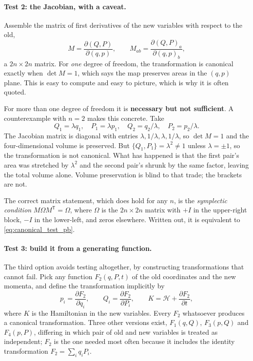 \documentclass[12pt]{article}
\newcommand{\Ham}{\mathcal{H}}
\newcommand{\pb}[2]{\{#1,#2\}}
\begin{document}
\paragraph{Test 2: the Jacobian, with a caveat.}  Assemble the matrix
of first derivatives of the new variables with respect to the old,
%
\begin{equation}
  M = \frac{\partial(Q,P)}{\partial(q,p)},
  \qquad
  M_{ab} = \frac{\partial(Q,P)_a}{\partial(q,p)_b} ,
  \label{eq:jacobian_matrix}
\end{equation}
%
a $2n\times 2n$ matrix.  For \emph{one} degree of freedom, the
transformation is canonical exactly when $\det M = 1$, which says the
map preserves areas in the $(q,p)$ plane.  This is easy to compute and
easy to picture, which is why it is often quoted.

For more than one degree of freedom it is \textbf{necessary but not
sufficient}.  A counterexample with $n = 2$ makes this concrete.  Take
%
\begin{equation}
  Q_1 = \lambda q_1, \quad P_1 = \lambda p_1, \quad
  Q_2 = q_2/\lambda, \quad P_2 = p_2/\lambda .
\end{equation}
%
The Jacobian matrix is diagonal with entries
$\lambda,1/\lambda,\lambda,1/\lambda$, so $\det M = 1$ and the
four-dimensional volume is preserved.  But
$\pb{Q_1}{P_1} = \lambda^2 \neq 1$ unless $\lambda = \pm 1$, so the
transformation is not canonical.  What has happened is that the first
pair's area was stretched by $\lambda^2$ and the second pair's shrunk
by the same factor, leaving the total volume alone.  Volume
preservation is blind to that trade; the brackets are not.

The correct matrix statement, which does hold for any $n$, is the
\emph{symplectic condition} $M \Omega M^{\mathsf T} = \Omega$, where
$\Omega$ is the $2n\times2n$ matrix with $+I$ in the upper-right
block, $-I$ in the lower-left, and zeros elsewhere.  Written out, it
is equivalent to \eqref{eq:canonical_test_pb}.

\paragraph{Test 3: build it from a generating function.}  The third
option avoids testing altogether, by constructing transformations that
cannot fail.  Pick any function $F_2(q,P,t)$ of the old coordinates and
the new momenta, and define the transformation implicitly by
%
\begin{equation}
  p_i = \frac{\partial F_2}{\partial q_i} ,
  \qquad
  Q_i = \frac{\partial F_2}{\partial P_i} ,
  \qquad
  K = \Ham + \frac{\partial F_2}{\partial t} ,
  \label{eq:generating_F2}
\end{equation}
%
where $K$ is the Hamiltonian in the new variables.  Every $F_2$
whatsoever produces a canonical transformation.  Three other versions
exist, $F_1(q,Q)$, $F_3(p,Q)$ and $F_4(p,P)$, differing in which pair
of old and new variables is treated as independent; $F_2$ is the one
needed most often because it includes the identity transformation
$F_2 = \sum_i q_i P_i$.
\end{document}
